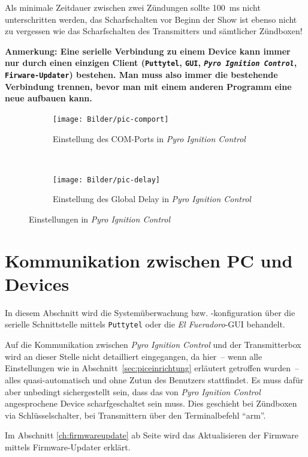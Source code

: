 \documentclass[paper=a4, parskip, numbers=noenddot, toc=listof, headsepline]{scrbook}
\newcommand{\pic}{\emph{Pyro Ignition Control}}
\newcommand{\anlage}{\emph{El Fueradoro}}
\begin{document}
			Als minimale Zeitdauer zwischen zwei Zündungen sollte \SI{100}{\milli\second} nicht unterschritten werden, das Scharfschalten vor Beginn der Show ist ebenso nicht zu vergessen wie das Scharfschalten des Transmitters und sämtlicher Zündboxen!

			\textbf{Anmerkung: Eine serielle Verbindung zu einem Device kann immer nur durch einen einzigen Client (\texttt{Putty\-tel}, \texttt{GUI}, \texttt{\pic}, \texttt{Firware-Updater}) bestehen. Man muss also immer die bestehende Verbindung trennen, bevor man mit einem anderen Programm eine neue aufbauen kann.}

			\begin{figure}
				\begin{subfigure}[t]{\textwidth}
					\centering
					\texttt{[image: Bilder/pic-comport]}
					\caption{Einstellung des COM-Ports in {\pic}}
					\label{fig:pic-comport}
				\end{subfigure}
				\\[50pt]
				\begin{subfigure}[t]{\textwidth}
					\centering
					\texttt{[image: Bilder/pic-delay]}
					\caption{Einstellung des Global Delay in \pic}
					\label{fig:pic-delay}
				\end{subfigure}
				\caption{Einstellungen in {\pic}}
			\end{figure}

	\chapter{Kommunikation zwischen PC und Devices}
		\label{ch:kommunikationpc}

		In diesem Abschnitt wird die Systemüberwachung bzw. -konfiguration über die serielle Schnittstelle mittels \texttt{Puttytel} oder die {\anlage}-GUI behandelt.

		Auf die Kommunikation zwischen {\pic} und der Transmitterbox wird an dieser Stelle nicht detailliert eingegangen, da hier~-- wenn alle Einstellungen wie in Abschnitt~\ref{sec:piceinrichtung} erläutert getroffen wurden~-- alles quasi-automatisch und ohne Zutun des Benutzers stattfindet. Es muss dafür aber unbedingt sichergestellt sein, dass das von {\pic} angesprochene Device scharfgeschaltet sein muss. Dies geschieht bei Zündboxen via Schlüsselschalter, bei Transmittern über den Terminalbefehl \enquote{arm}.

		Im Abschnitt \ref{ch:firmwareupdate} ab Seite \pageref{ch:firmwareupdate} wird das Aktualisieren der Firmware mittels Firmware-Updater erklärt.
\end{document}

